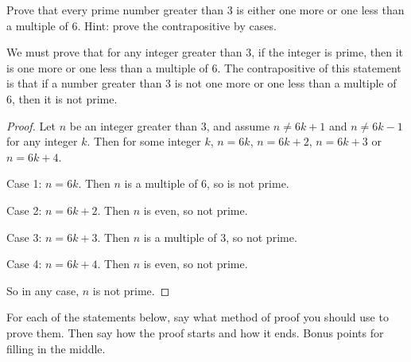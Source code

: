 \begin{questions}
\question Prove that every prime number greater than 3 is either one more or one less than a multiple of 6.  Hint: prove the contrapositive by cases.

	\begin{answer}
		We must prove that for any integer greater than 3, if the integer is prime, then it is one more or one less than a multiple of 6.  The contrapositive of this statement is that if a number greater than 3 is not one more or one less than a multiple of 6, then it is not prime.
		\begin{proof}
		      Let $n$ be an integer greater than 3, and assume $n \ne 6k+1$ and $n \ne 6k-1$ for any integer $k$.  Then for some integer $k$, $n = 6k$, $n = 6k+2$, $n = 6k+3$ or $n = 6k+4$.  
		      
		      Case 1: $n = 6k$.  Then $n$ is a multiple of 6, so is not prime.
		      
		      Case 2: $n = 6k+2$.  Then $n$ is even, so not prime.
		      
		      Case 3: $n = 6k+3$.  Then $n$ is a multiple of 3, so not prime.
		      
		      Case 4: $n = 6k+4$.  Then $n$ is even, so not prime.
		      
		      So in any case, $n$ is not prime.
		    \end{proof}
	\end{answer}



\question For each of the statements below, say what method of proof you should use to prove them.  Then say how the proof starts and how it ends.  Bonus points for filling in the middle.


\end{questions}
